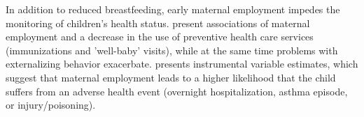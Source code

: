 \documentclass[11pt, a4paper,draft]{article} %
\begin{document}
In addition to reduced breastfeeding, early maternal employment impedes the monitoring of children's health status. \cite{berger2005earlymaternal} present associations of maternal employment and a decrease in the use of preventive health care services (immunizations and 'well-baby' visits), while at the same time problems with externalizing behavior exacerbate. \cite{morrill2011} presents instrumental variable estimates, which suggest that maternal employment leads to a higher likelihood that the child suffers from an adverse health event (overnight hospitalization, asthma episode, or injury/poisoning).\newline 









\end{document}

